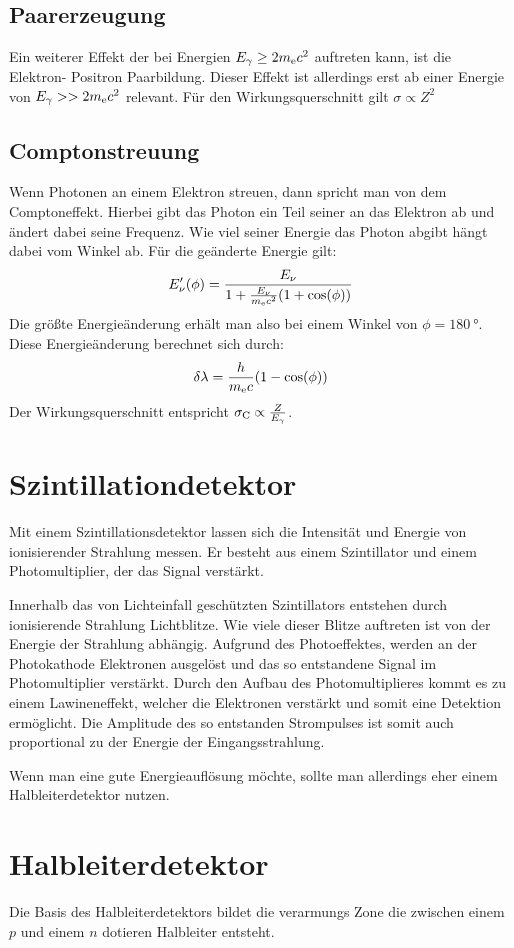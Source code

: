 \documentclass[11pt, ngerman, fleqn, DIV=15, headinclude, BCOR=2cm]{scrreprt}
\begin{document}
\subsection{Paarerzeugung}
Ein weiterer Effekt der bei Energien $E_\gamma \ge 2m_\text ec^2$ auftreten
kann, ist die Elektron- Positron Paarbildung.
Dieser Effekt ist allerdings erst ab einer Energie von $E_\gamma >> 2m_\text
ec^2$ relevant.
Für den Wirkungsquerschnitt gilt $\sigma \propto Z^2$

\subsection{Comptonstreuung}
Wenn Photonen an einem Elektron streuen, dann spricht man von dem
Comptoneffekt. 
Hierbei gibt das Photon ein Teil seiner an das Elektron ab und ändert dabei
seine Frequenz.
Wie viel seiner Energie das Photon abgibt hängt dabei vom Winkel ab.
Für die geänderte Energie gilt:
\[
    E_\nu'(\phi) = \frac{E_\nu}{1+\frac{E_\nu}{m_\text ec^2}(1+\cos(\phi))}
\]
Die größte Energieänderung erhält man also bei einem Winkel von
$\phi=\SI{180}{\degree}$.
Diese Energieänderung berechnet sich durch:
\[
    \delta\lambda = \frac{h}{m_\text ec}(1-\cos(\phi))
\]
Der Wirkungsquerschnitt entspricht $\sigma_\text C \propto \frac{Z}{E_\gamma}$.

\section{Szintillationdetektor}
Mit einem Szintillationsdetektor lassen sich die Intensität und Energie von
ionisierender Strahlung messen.
Er besteht aus einem Szintillator und einem Photomultiplier, der das Signal
verstärkt.

Innerhalb das von Lichteinfall geschützten Szintillators entstehen durch
ionisierende Strahlung Lichtblitze. 
Wie viele dieser Blitze auftreten ist von der Energie der Strahlung abhängig.
Aufgrund des Photoeffektes, werden an der Photokathode Elektronen ausgelöst und
das so entstandene Signal im Photomultiplier verstärkt.
Durch den Aufbau des Photomultiplieres kommt es zu einem Lawineneffekt, welcher
die Elektronen verstärkt und somit eine Detektion ermöglicht.
Die Amplitude des so entstanden Strompulses ist somit auch proportional zu der
Energie der Eingangsstrahlung.

Wenn man eine gute Energieauflösung möchte, sollte man allerdings eher einem
Halbleiterdetektor nutzen.

\section{Halbleiterdetektor}
Die Basis des Halbleiterdetektors bildet die verarmungs Zone die zwischen einem
$p$ und einem $n$ dotieren Halbleiter entsteht.
\end{document}

